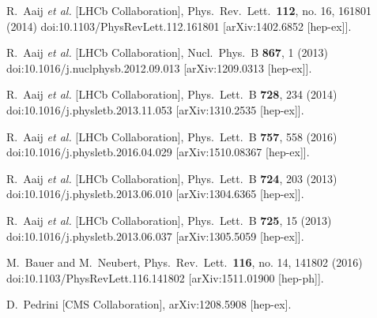 \documentclass{PoS}
\begin{document}
\begin{thebibliography}{99}
  R.~Aaij {\it et al.} [LHCb Collaboration],
  Phys.\ Rev.\ Lett.\  {\bf 112}, no. 16, 161801 (2014)
  doi:10.1103/PhysRevLett.112.161801
  [arXiv:1402.6852 [hep-ex]].

  R.~Aaij {\it et al.} [LHCb Collaboration],
  Nucl.\ Phys.\ B {\bf 867}, 1 (2013)
  doi:10.1016/j.nuclphysb.2012.09.013
  [arXiv:1209.0313 [hep-ex]].

  R.~Aaij {\it et al.} [LHCb Collaboration],
  Phys.\ Lett.\ B {\bf 728}, 234 (2014)
  doi:10.1016/j.physletb.2013.11.053
  [arXiv:1310.2535 [hep-ex]].

  R.~Aaij {\it et al.} [LHCb Collaboration],
  Phys.\ Lett.\ B {\bf 757}, 558 (2016)
  doi:10.1016/j.physletb.2016.04.029
  [arXiv:1510.08367 [hep-ex]].


  R.~Aaij {\it et al.} [LHCb Collaboration],
  Phys.\ Lett.\ B {\bf 724}, 203 (2013)
  doi:10.1016/j.physletb.2013.06.010
  [arXiv:1304.6365 [hep-ex]].

  R.~Aaij {\it et al.} [LHCb Collaboration],
  Phys.\ Lett.\ B {\bf 725}, 15 (2013)
  doi:10.1016/j.physletb.2013.06.037
  [arXiv:1305.5059 [hep-ex]].
 
  M.~Bauer and M.~Neubert,
  Phys.\ Rev.\ Lett.\  {\bf 116}, no. 14, 141802 (2016)
  doi:10.1103/PhysRevLett.116.141802
  [arXiv:1511.01900 [hep-ph]].

  D.~Pedrini [CMS Collaboration],
  arXiv:1208.5908 [hep-ex].

\end{thebibliography}
\end{document}

